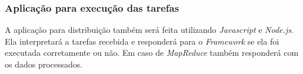 \subsubsection{Aplicação para execução das tarefas}
A aplicação para distribuição também será feita utilizando \emph{Javascript} e
\emph{Node.js}. Ela interpretará a tarefas recebida e responderá para o
\emph{Framework} se ela foi executada corretamente ou não. Em caso de
\emph{MapReduce} também responderá com os dados processados.
